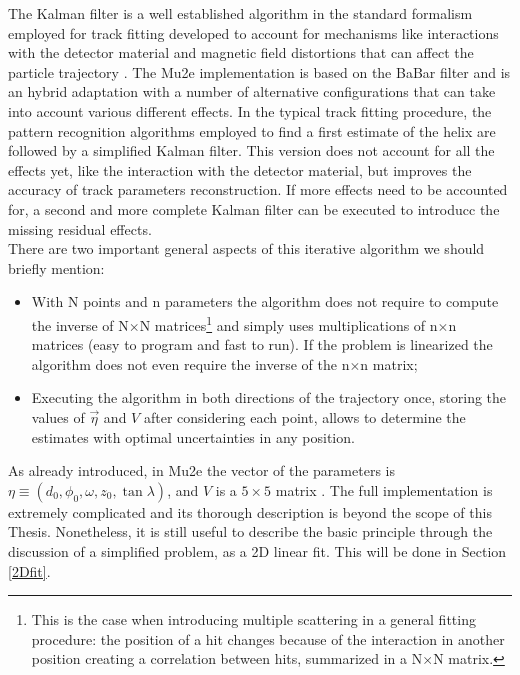 \documentclass[12pt,a4paper,openright, oneside, titlepage]{book} %
\begin{document}
\noindent The Kalman filter is a well established algorithm in the standard formalism employed for track fitting developed to account for mechanisms like interactions with the detector material and magnetic field distortions that can affect the particle trajectory \cite{Kalman:1984}\cite{Kalman:1987}. 
The Mu2e implementation is based on the BaBar filter and is an hybrid adaptation \cite{Kalman} \cite{Kalman:1987} 
with a number of alternative configurations that can take into account various different effects. 
In the typical track fitting procedure, 
the pattern recognition algorithms employed to find a first estimate of the helix are followed by a simplified Kalman filter. 
This version does not account for all the effects yet, 
like the interaction with the detector material, 
but improves the accuracy of track parameters reconstruction. 
If more effects need to be accounted for, 
a second and more complete Kalman filter can be executed 
to introducc the missing residual effects. \\
There are two important general aspects of this iterative algorithm we should briefly mention: 
\begin{itemize}
\item With N points and n parameters the algorithm does not require to compute the inverse of N$\times$N matrices\footnote{This is the case when introducing multiple scattering in a general fitting procedure: the position of a hit changes because of the interaction in another position creating a correlation between hits, summarized in a N$\times$N matrix.} and simply uses multiplications of n$\times$n matrices (easy to program and fast to run).
If the problem is linearized the algorithm does not even require the inverse of the n$\times$n matrix;
\item Executing the algorithm in both directions of the trajectory once, storing the values of $\vec{\eta}$ and $V$ after considering each point, allows to determine the estimates with optimal uncertainties in any position.
\end{itemize} 
As already introduced, in Mu2e the vector of the parameters is $\eta \equiv ( d_0, \phi_0, \omega, z_0, \tan \lambda)$, and $V$ is a $5\times5$ matrix \cite{Kalman}.  
The full implementation is extremely complicated and its thorough description is beyond the scope
of this Thesis. 
Nonetheless, it is still useful to describe the basic principle through the discussion of a simplified problem, as a 2D linear fit. 
This will be done in Section \ref{2Dfit}.\\
\end{document}

